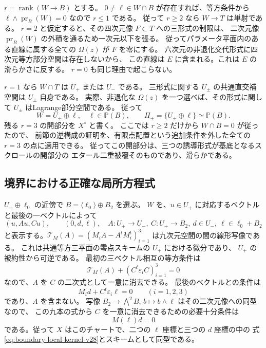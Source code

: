 $r=\operatorname{rank}(W\to B)$ とする。
$0\ne\ell\in W\cap B$ が存在すれば、等方条件から
$\ell\wedge\operatorname{pr}_B(W)=0$ なので $r\le1$ である。
従って $r\ge2$ なら $W\to T$ は単射である。
$r=2$ と仮定すると、その四次元像 $F\subset T$ への三形式の制限は、
二次元像 $\operatorname{pr}_B(W)$ の外積を通るため一次元以下を張る。
従ってパラメータ平面内のある直線に属する全ての $\Omega(z)$ が $F$ を零にする。
六次元の非退化交代形式に四次元等方部分空間は存在しないから、
この直線は $E$ に含まれる。これは $E$ の滑らかさに反する。
$r=0$ も同じ理由で起こらない。

$r=1$ なら $W\cap T$ は $U_+$ または $U_-$ である。
三形式に関する $U_\pm$ の共通直交補空間は $U_\pm$ 自身である。
実際、非退化な $\Omega(z)$ を一つ選べば、その形式に関して $U_\pm$ はLagrange部分空間である。
従って
\[
 W=U_\pm\oplus\ell,\quad \ell\in\mathbb P(B),
 \qquad
 \Pi_\pm=\{U_\pm\oplus\ell\}\simeq\mathbb P(B).
\]
残る $r=3$ の開部分を $X^\circ$ と書く。
ここでは $r\ge2$ だけから $W\cap B=0$ が従ったので、
前節の逆構成の証明を、有限点配置という追加条件を外した全ての $r=3$ の点に適用できる。
従ってこの開部分は、三つの誘導形式が基底となるスクロールの開部分の
エタール二重被覆そのものであり、滑らかである。

\subsection{境界における正確な局所方程式}

$U_+\oplus\ell_0$ の近傍で $B=\langle\ell_0\rangle\oplus B_2$ を選ぶ。
$W$ を、$u\in U_+$ に対応するベクトルと最後の一ベクトルによって
\[
 (u,Au,Cu),\qquad (0,d,\ell),
 \quad
 A:U_+\to U_-,\ C:U_+\to B_2,\ d\in U_-,\
 \ell\in\ell_0+B_2
\]
と表示する。$
\mathcal T_M(A)=(M_iA-A^tM_i^t)_{i=1}^3
$ は九次元空間の間の線形写像である。
これは共通等方三平面の零点スキームの $U_+$ における微分であり、
$U_+$ の被約性から可逆である。
最初の三ベクトル相互の等方条件は
\[
 \mathcal T_M(A)+(C^t\varepsilon_i C)_{i=1}^3=0
\]
なので、$A$ を $C$ の二次式として一意に消去できる。
最後のベクトルとの条件は
\[
 M_i d+C^t\varepsilon_i\ell=0\qquad(i=1,2,3)
\]
であり、$A$ を含まない。
写像 $B_2\to\bigwedge^2B$, $b\mapsto b\wedge\ell$ はその二次元像への同型なので、
この九本の式から $C$ を一意に消去できるための必要十分条件は
\begin{equation}\label{eq:boundary-local-kernel-v28}
 M(\ell)d=0
\end{equation}
である。従って $X$ はこのチャートで、二つの $\ell$ 座標と三つの $d$ 座標の中の
式\eqref{eq:boundary-local-kernel-v28}とスキームとして同型である。

